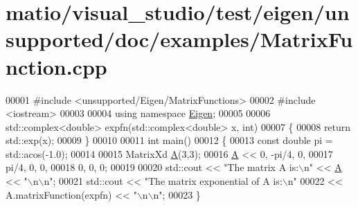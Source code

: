\hypertarget{matio_2visual__studio_2test_2eigen_2unsupported_2doc_2examples_2_matrix_function_8cpp_source}{}\section{matio/visual\+\_\+studio/test/eigen/unsupported/doc/examples/\+Matrix\+Function.cpp}
\label{matio_2visual__studio_2test_2eigen_2unsupported_2doc_2examples_2_matrix_function_8cpp_source}

\begin{DoxyCode}
00001 \textcolor{preprocessor}{#include <unsupported/Eigen/MatrixFunctions>}
00002 \textcolor{preprocessor}{#include <iostream>}
00003 
00004 \textcolor{keyword}{using namespace }\hyperlink{namespace_eigen}{Eigen};
00005 
00006 std::complex<double> expfn(std::complex<double> x, \textcolor{keywordtype}{int})
00007 \{
00008   \textcolor{keywordflow}{return} std::exp(x);
00009 \}
00010 
00011 \textcolor{keywordtype}{int} main()
00012 \{
00013   \textcolor{keyword}{const} \textcolor{keywordtype}{double} pi = std::acos(-1.0);
00014 
00015   MatrixXd \hyperlink{group___core___module_class_eigen_1_1_matrix}{A}(3,3);
00016   \hyperlink{group___core___module_class_eigen_1_1_matrix}{A} << 0,    -pi/4, 0,
00017        pi/4, 0,     0,
00018        0,    0,     0;
00019 
00020   std::cout << \textcolor{stringliteral}{"The matrix A is:\(\backslash\)n"} << \hyperlink{group___core___module_class_eigen_1_1_matrix}{A} << \textcolor{stringliteral}{"\(\backslash\)n\(\backslash\)n"};
00021   std::cout << \textcolor{stringliteral}{"The matrix exponential of A is:\(\backslash\)n"} 
00022             << A.matrixFunction(expfn) << \textcolor{stringliteral}{"\(\backslash\)n\(\backslash\)n"};
00023 \}
\end{DoxyCode}
